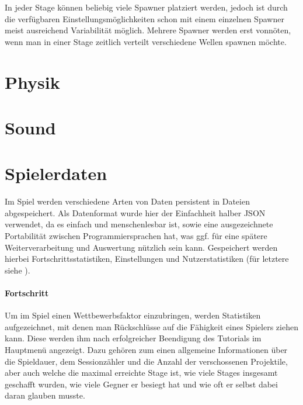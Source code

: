 In jeder Stage können beliebig viele Spawner platziert werden, jedoch ist durch die verfügbaren Einstellungsmöglichkeiten schon mit einem einzelnen Spawner meist ausreichend Variabilität möglich. Mehrere Spawner werden erst vonnöten, wenn man in einer Stage zeitlich verteilt verschiedene Wellen spawnen möchte.




\section{Physik}

\lipsum[1]



\section{Sound}

\lipsum[1]



\section{Spielerdaten}

Im Spiel werden verschiedene Arten von Daten persistent in Dateien abgespeichert. Als Datenformat wurde hier der Einfachheit halber JSON verwendet, da es einfach und menschenlesbar ist, sowie eine ausgezeichnete Portabilität zwischen Programmiersprachen hat, was ggf. für eine spätere Weiterverarbeitung und Auswertung nützlich sein kann. Gespeichert werden hierbei Fortschrittsstatistiken, Einstellungen und Nutzerstatistiken (für letztere siehe ).



\paragraph{Fortschritt}

Um im Spiel einen Wettbewerbsfaktor einzubringen, werden Statistiken aufgezeichnet, mit denen man Rückschlüsse auf die Fähigkeit eines Spielers ziehen kann. Diese werden ihm nach erfolgreicher Beendigung des Tutorials im Hauptmenü angezeigt. Dazu gehören zum einen allgemeine Informationen über die Spieldauer, dem Sessionzähler und die Anzahl der verschossenen Projektile, aber auch welche die maximal erreichte Stage ist, wie viele Stages insgesamt geschafft wurden, wie viele Gegner er besiegt hat und wie oft er selbst dabei daran glauben musste.

